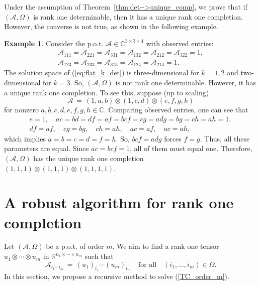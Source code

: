 \documentclass{amsart}
\newcommand{\re}{\mathbb{R}}
\newcommand{\C}{\mathbb{C}}
\newcommand{\reff}[1]{(\ref{#1})}
\newcommand{\mc}[1]{\mathcal{#1}}
\newcommand{\ddd}{,\ldots,}
\newcommand{\be}{\begin{equation}}
\newcommand{\ee}{\end{equation}}
\newcommand{\baray}{\begin{array}}
\newcommand{\earay}{\end{array}}
\theoremstyle{definition}
\newtheorem{example}[theorem]{Example}
\numberwithin{equation}{section}
\begin{document}
Under the assumption of Theorem~\ref{thm:det-->unique_comp},
we prove that if $(\mc{A}, \Omega)$ is rank one determinable, 
then it has a unique rank one completion.
However, the converse is not true, as shown in the following example.

\begin{example}
Consider the p.o.t. $\mc{A} \in \C^{3 \times 3 \times 4}$ with observed entries:
\[
\baray{l}
\mc{A}_{111} = \mc{A}_{221} = \mc{A}_{331} = \mc{A}_{132} 
= \mc{A}_{212} = \mc{A}_{322} = 1, \\
\mc{A}_{123} = \mc{A}_{233} = \mc{A}_{313} = \mc{A}_{124} = \mc{A}_{214} = 1.
\earay
\]
The solution space of \reff{eq:flat_k_det} is three-dimensional for $k=1,2$
and two-dimensional for $k=3$.
So, $(\mc{A}, \Omega)$ is not rank one determinable.
However, it has a unique rank one completion.
To see this, suppose (up to scaling)
\[
\mc{A} \,=\, (1,a,b) \otimes (1,c,d) \otimes (e,f,g,h)
\]
for nonzero $a,b,c,d,e,f,g,h \in \C$.
Comparing observed entries, one can see that
\[
\begin{gathered}
e=1, \quad ac=bd=df=af=bcf=cg=adg=bg=ch=ah=1, \\
df=af, \quad
cg=bg, \quad
ch=ah, \quad
ac=af, \quad
ac=ah,
\end{gathered}
\]
which implies $a=b=c=d=f=h$.
So, $bcf=adg$ forces $f=g$. 
Thus, all these parameters are equal.
Since $ac=bcf=1$, all of them must equal one.
Therefore, $(\mc{A}, \Omega)$ has the unique rank one completion
$
(1,1,1) \otimes (1,1,1) \otimes (1,1,1,1).
$
\end{example}


























\section{A robust algorithm for rank one completion}\label{sc:TC_alg}

Let $(\mc{A}, \Omega)$ be a p.o.t. of order $m$.
We aim to find a rank one tensor $u_1 \otimes \cdots \otimes u_m$ 
in $\re^{n_1 \times \cdots \times n_m}$
such that
\be\label{TC_order_m}
\mc{A}_{i_1 \cdots i_m} \,=\, (u_1)_{i_1} \cdots (u_m)_{i_m}
\quad \text{for all} \quad (i_1\ddd i_m) \in \Omega.
\ee
In this section, we propose a recursive method to solve \reff{TC_order_m}.
\end{document}
